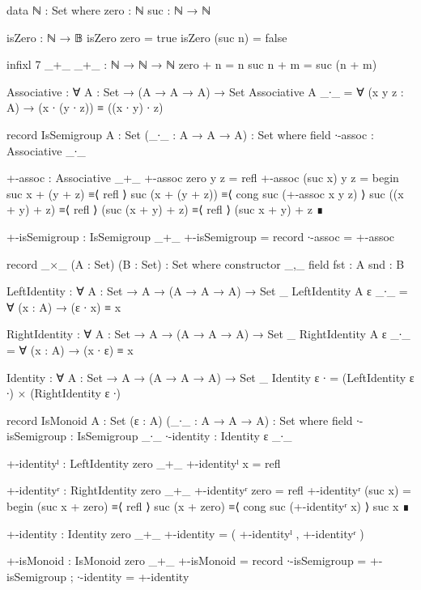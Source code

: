 \documentclass[./Thesis.tex]{subfiles}
\begin{document}
\begin{code}
  data ℕ : Set where
    zero : ℕ
    suc  : ℕ → ℕ

  isZero : ℕ → 𝔹
  isZero zero = true
  isZero (suc n) = false

  infixl 7 _+_
  _+_ : ℕ → ℕ → ℕ
  zero + n = n
  suc n + m = suc (n + m)

  Associative : ∀ {A : Set} → (A → A → A) → Set
  Associative {A} _∙_ = ∀ (x y z : A) → (x ∙ (y ∙ z)) ≡ ((x ∙ y) ∙ z)

  record IsSemigroup {A : Set} (_∙_ : A → A → A) : Set where
    field
      ∙-assoc : Associative _∙_

  +-assoc : Associative _+_
  +-assoc zero y z = refl
  +-assoc (suc x) y z = begin
    suc x + (y + z)   ≡⟨ refl ⟩
    suc (x + (y + z)) ≡⟨ cong suc (+-assoc x y z) ⟩
    suc ((x + y) + z) ≡⟨ refl ⟩
    (suc (x + y) + z) ≡⟨ refl ⟩
    (suc x + y) + z   ∎

  +-isSemigroup : IsSemigroup _+_
  +-isSemigroup = record { ∙-assoc = +-assoc }

  record _×_ (A : Set) (B : Set) : Set where
    constructor _,_
    field
      fst : A
      snd : B

  LeftIdentity : ∀ {A : Set} → A → (A → A → A) → Set _
  LeftIdentity {A} ε _∙_ = ∀ (x : A) → (ε ∙ x) ≡ x

  RightIdentity : ∀ {A : Set} → A → (A → A → A) → Set _
  RightIdentity {A} ε _∙_ = ∀ (x : A) → (x ∙ ε) ≡ x

  Identity : ∀ {A : Set} → A → (A → A → A) → Set _
  Identity ε ∙ = (LeftIdentity ε ∙) × (RightIdentity ε ∙)

  record IsMonoid {A : Set} (ε : A) (_∙_ : A → A → A) : Set where
    field
      ∙-isSemigroup : IsSemigroup _∙_
      ∙-identity : Identity ε _∙_

  +-identityˡ : LeftIdentity zero _+_
  +-identityˡ x = refl

  +-identityʳ : RightIdentity zero _+_
  +-identityʳ zero = refl
  +-identityʳ (suc x) = begin
    (suc x + zero) ≡⟨ refl ⟩
    suc (x + zero) ≡⟨ cong suc (+-identityʳ x) ⟩
    suc x          ∎
    
  +-identity : Identity zero _+_
  +-identity = ( +-identityˡ , +-identityʳ )

  +-isMonoid : IsMonoid zero _+_
  +-isMonoid = record { ∙-isSemigroup = +-isSemigroup ; ∙-identity = +-identity }
\end{code}

\begin{code}
\end{code}
\end{document}
